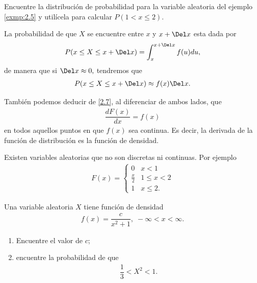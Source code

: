 	\begin{ejemplo}
	  \label{exmp:0.2.6}
	  Encuentre la distribución de probabilidad para la variable aleatoria del ejemplo
	  \ref{exmp:2.5} y utilícela para calcular $P(1 < x \leq 2).$
	\end{ejemplo}



	La probabilidad de que $X$ se encuentre entre $x$ y $x+\Del x$ esta dada por
	\begin{align}
		\label{eq:0.2.9}
		P(x \leq X \leq x+\Del x)= \int_{x}^{x+\Del x}f(u)du,
	\end{align} 
	de manera que si $\Del x \approx 0,$ tendremos que
	\begin{align}
		\label{eq:0.2.10}
		P(x \leq X \leq x+\Del x)\approx f(x) \Del x.
	\end{align}



	También podemos deducir de \eqref{2.7}, al diferenciar de ambos lados, que
	\begin{align}
		\label{eq:0.2.11}
		\dfrac{dF(x)}{dx} = f(x)
	\end{align}
en todos aquellos puntos en que $f(x)$ sea continua.  Es decir, la derivada de la función de distribución es la función de densidad.


	\begin{observacion}
		Existen variables aleatorias que no son discretas ni continuas.  Por ejemplo
		\begin{align}
			F(x)=
			\begin{cases}
				0 & x <1 \\
				\frac{x}{2} & 1 \leq x < 2 \\
				1 & x \leq 2.
			\end{cases}
		\end{align}

	\end{observacion}



 \begin{ejemplo}
  \label{sol:0.2.5} Una variable aleatoria $X$ tiene función de densidad
  \begin{align}
   f(x)=\dfrac{c}{x^{2}+1}, \; -\infty < x <\infty.
  \end{align}

  \begin{enumerate}
   \item Encuentre el valor de $c$; 
   \item encuentre la probabilidad de que
   \begin{align}
    \dfrac{1}{3}< X^{2} <1.
   \end{align}

  \end{enumerate}

 \end{ejemplo}



